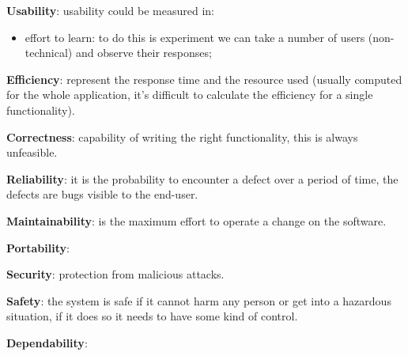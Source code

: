 \documentclass[12pt]{article}
\begin{document}
\textbf{Usability}: usability could be measured in:
\begin{itemize}
  \item effort to learn: to do this is experiment we can take a number of users (non-technical) and observe their responses;
\end{itemize}

\textbf{Efficiency}: represent the response time and the resource used (usually computed for the whole application, it's difficult to calculate the efficiency for a single functionality).

\textbf{Correctness}: capability of writing the right functionality, this is always unfeasible.


\textbf{Reliability}: it is the probability to encounter a defect over a period of time, the defects are bugs visible to the end-user.

\textbf{Maintainability}: is the maximum effort to operate a change on the software.

\textbf{Portability}:

\textbf{Security}: protection from malicious attacks.

\textbf{Safety}: the system is safe if it cannot harm any person or get into a hazardous situation, if it does so it needs to have some kind of control.

\textbf{Dependability}:







\newpage
\end{document}
